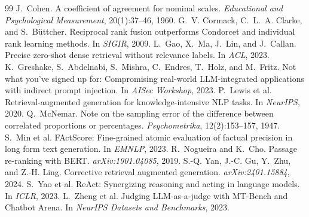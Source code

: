 \documentclass[10pt,a4paper]{article}
\begin{document}
\begin{thebibliography}{99}\small
{} J.~Cohen. A coefficient of agreement for nominal scales. \emph{Educational and Psychological
Measurement}, 20(1):37--46, 1960.
 G.~V. Cormack, C.~L.~A. Clarke, and S.~B{\"u}ttcher. Reciprocal rank fusion outperforms
Condorcet and individual rank learning methods. In \emph{SIGIR}, 2009.
 L.~Gao, X.~Ma, J.~Lin, and J.~Callan. Precise zero-shot dense retrieval without relevance labels.
In \emph{ACL}, 2023.
 K.~Greshake, S.~Abdelnabi, S.~Mishra, C.~Endres, T.~Holz, and M.~Fritz. Not what
you've signed up for: Compromising real-world LLM-integrated applications with indirect prompt injection. In
\emph{AISec Workshop}, 2023.
 P.~Lewis et al. Retrieval-augmented generation for knowledge-intensive NLP tasks. In
\emph{NeurIPS}, 2020.
 Q.~McNemar. Note on the sampling error of the difference between correlated proportions or
percentages. \emph{Psychometrika}, 12(2):153--157, 1947.
 S.~Min et al. FActScore: Fine-grained atomic evaluation of factual precision in long form
text generation. In \emph{EMNLP}, 2023.
 R.~Nogueira and K.~Cho. Passage re-ranking with BERT. \emph{arXiv:1901.04085}, 2019.
 S.-Q. Yan, J.-C. Gu, Y.~Zhu, and Z.-H. Ling. Corrective retrieval augmented generation.
\emph{arXiv:2401.15884}, 2024.
 S.~Yao et al. ReAct: Synergizing reasoning and acting in language models. In \emph{ICLR}, 2023.
 L.~Zheng et al. Judging LLM-as-a-judge with MT-Bench and Chatbot Arena. In \emph{NeurIPS
Datasets and Benchmarks}, 2023.
\end{thebibliography}
\end{document}
